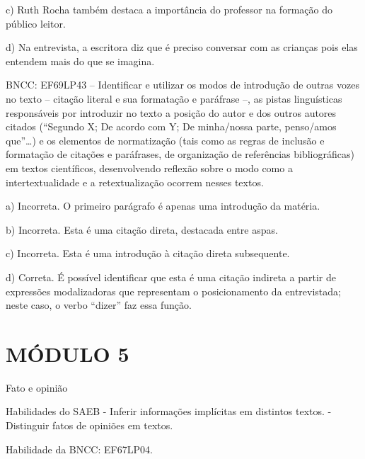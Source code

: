 c) Ruth Rocha também destaca a importância do professor na formação do
público leitor.

d) Na entrevista, a escritora diz que é preciso conversar com as
crianças pois elas entendem mais do que se imagina.

BNCC: EF69LP43 -- Identificar e utilizar os modos de introdução de
outras vozes no texto -- citação literal e sua formatação e paráfrase
--, as pistas linguísticas responsáveis por introduzir no texto a
posição do autor e dos outros autores citados (``Segundo X; De acordo
com Y; De minha/nossa parte, penso/amos que''\ldots) e os elementos de
normatização (tais como as regras de inclusão e formatação de citações e
paráfrases, de organização de referências bibliográficas) em textos
científicos, desenvolvendo reflexão sobre o modo como a
intertextualidade e a retextualização ocorrem nesses textos.

a) Incorreta. O primeiro parágrafo é apenas uma introdução da matéria.

b) Incorreta. Esta é uma citação direta, destacada entre aspas.

c) Incorreta. Esta é uma introdução à citação direta subsequente.

d) Correta. É possível identificar que esta é uma citação indireta a
partir de expressões modalizadoras que representam o posicionamento da
entrevistada; neste caso, o verbo ``dizer'' faz essa função.


\section{MÓDULO 5}

Fato e opinião

Habilidades do SAEB - Inferir informações implícitas em distintos
textos. - Distinguir fatos de opiniões em textos.

Habilidade da BNCC: EF67LP04.


